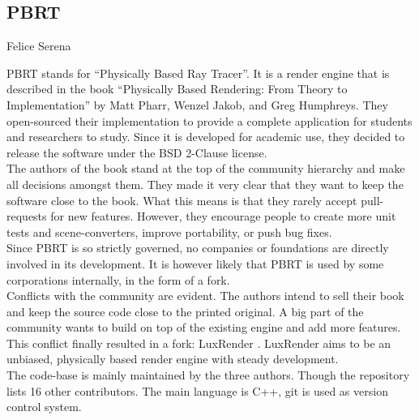 \subsection{PBRT}{Felice Serena}

PBRT stands for ``Physically Based Ray Tracer''. It is a render engine that is described in the book ``Physically Based Rendering: From Theory to Implementation'' by Matt Pharr, Wenzel Jakob, and Greg Humphreys. They open-sourced their implementation to provide a complete application for students and researchers to study. Since it is developed for academic use, they decided to release the software under the BSD 2-Clause license. \\

The authors of the book stand at the top of the community hierarchy and make all decisions amongst them. They made it very clear that they want to keep the software close to the book. What this means is that they rarely accept pull-requests for new features. However, they encourage people to create more unit tests and scene-converters, improve portability, or push bug fixes. \cite{pbrt-pull-requests} \\

Since PBRT is so strictly governed, no companies or foundations are directly involved in its development. It is however likely that PBRT is used by some corporations internally, in the form of a fork. \\

Conflicts with the community are evident. The authors intend to sell their book and keep the source code close to the printed original. A big part of the community wants to build on top of the existing engine and add more features. This conflict finally resulted in a fork: LuxRender \cite{luxrender-home}. LuxRender aims to be an unbiased, physically based render engine with steady development. \\

The code-base is mainly maintained by the three authors. Though the repository lists 16 other contributors. The main language is C++, git is used as version control system.

